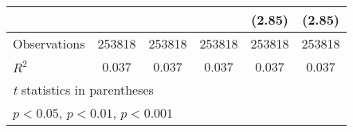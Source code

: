 {\begin{tabular}{l*{5}{c}}
                &                  &                  &                  &   (2.85)         &   (2.85)         \\
\hline
Observations    &   253818         &   253818         &   253818         &   253818         &   253818         \\
\(R^{2}\)       &    0.037         &    0.037         &    0.037         &    0.037         &    0.037         \\
\hline\hline
\multicolumn{6}{l}{\footnotesize \textit{t} statistics in parentheses}\\
\multicolumn{6}{l}{\footnotesize \sym{*} \(p<0.05\), \sym{**} \(p<0.01\), \sym{***} \(p<0.001\)}\\
\end{tabular}
}
